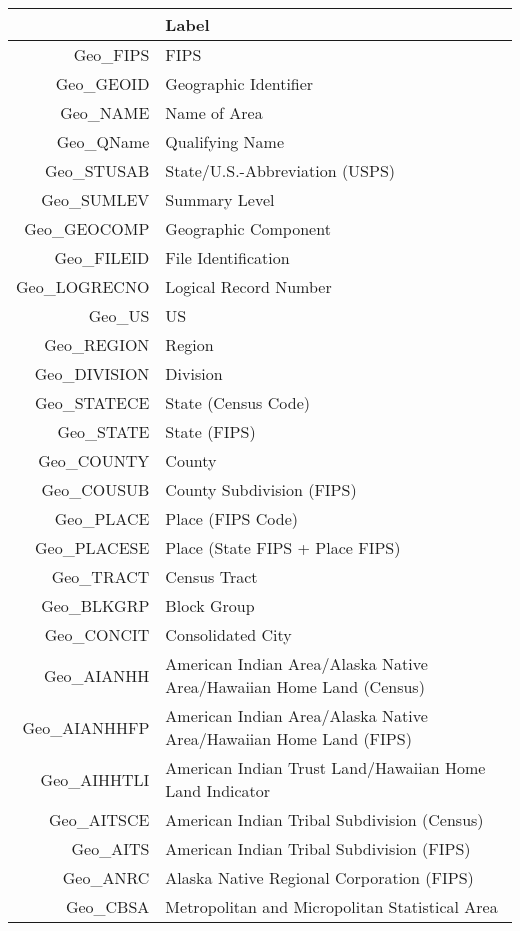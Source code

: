 \begingroup\small
\begin{longtable}{rp{5in}}
  \hline
 & Label \\ 
  \hline
Geo\_FIPS & FIPS \\ 
  Geo\_GEOID & Geographic Identifier \\ 
  Geo\_NAME & Name of Area \\ 
  Geo\_QName & Qualifying Name \\ 
  Geo\_STUSAB & State/U.S.-Abbreviation (USPS) \\ 
  Geo\_SUMLEV & Summary Level \\ 
  Geo\_GEOCOMP & Geographic Component \\ 
  Geo\_FILEID & File Identification \\ 
  Geo\_LOGRECNO & Logical Record Number \\ 
  Geo\_US & US \\ 
  Geo\_REGION & Region \\ 
  Geo\_DIVISION & Division \\ 
  Geo\_STATECE & State (Census Code) \\ 
  Geo\_STATE & State (FIPS) \\ 
  Geo\_COUNTY & County \\ 
  Geo\_COUSUB & County Subdivision (FIPS) \\ 
  Geo\_PLACE & Place (FIPS Code) \\ 
  Geo\_PLACESE & Place (State FIPS + Place FIPS) \\ 
  Geo\_TRACT & Census Tract \\ 
  Geo\_BLKGRP & Block Group \\ 
  Geo\_CONCIT & Consolidated City \\ 
  Geo\_AIANHH & American Indian Area/Alaska Native Area/Hawaiian Home Land (Census) \\ 
  Geo\_AIANHHFP & American Indian Area/Alaska Native Area/Hawaiian Home Land (FIPS) \\ 
  Geo\_AIHHTLI & American Indian Trust Land/Hawaiian Home Land Indicator \\ 
  Geo\_AITSCE & American Indian Tribal Subdivision (Census) \\ 
  Geo\_AITS & American Indian Tribal Subdivision (FIPS) \\ 
  Geo\_ANRC & Alaska Native Regional Corporation (FIPS) \\ 
  Geo\_CBSA & Metropolitan and Micropolitan Statistical Area \\ 

\end{longtable}
